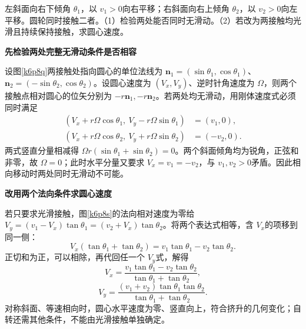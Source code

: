 \begin{question}\begin{example}[两斜面夹轮的约束检验]\label{k6p8}
左斜面向右下倾角 $\theta_1$，以 $v_1>0$向右平移；右斜面向右上倾角 $\theta_2$，以 $v_2>0$向左平移。圆轮同时接触二者。（1）检验两处能否同时无滑动。（2）若改为两接触均光滑且持续保持接触，求圆心速度。\end{example}
\end{question}
\begin{solution}\textbf{先检验两处完整无滑动条件是否相容}\par\nobreak
设图\ref{k6p8q}两接触处指向圆心的单位法线为 $\bm n_1=(\sin\theta_1,\cos\theta_1)$、$\bm n_2=(-\sin\theta_2,\cos\theta_2)$。设圆心速度为 $(V_x,V_y)$、逆时针角速度为 $\Omega$，则两个接触点相对圆心的位矢分别为 $-r\bm n_1,-r\bm n_2$。若两处均无滑动，用刚体速度式必须同时满足
\begin{align*}
 (V_x+r\Omega\cos\theta_1,\ V_y-r\Omega\sin\theta_1)&=(v_1,0),\\
 (V_x+r\Omega\cos\theta_2,\ V_y+r\Omega\sin\theta_2)&=(-v_2,0).
\end{align*}
两式竖直分量相减得 $\Omega r(\sin\theta_1+\sin\theta_2)=0$。两个斜面倾角均为锐角，正弦和非零，故 $\Omega=0$；此时水平分量又要求 $V_x=v_1=-v_2$，与 $v_1,v_2>0$矛盾。因此相向移动时两处同时无滑动不可能。



\par\medskip{}\noindent\textbf{改用两个法向条件求圆心速度}\par\nobreak
若只要求光滑接触，图\ref{k6p8s}的法向相对速度为零给 $V_y=(v_1-V_x)\tan\theta_1=(v_2+V_x)\tan\theta_2$。将两个表达式相等，含 $V_x$的项移到同一侧：
\[
 V_x(\tan\theta_1+\tan\theta_2)
 =v_1\tan\theta_1-v_2\tan\theta_2.
\]
正切和为正，可以相除，再代回任一个 $V_y$式，解得
\[\boxed{V_x=\frac{v_1\tan\theta_1-v_2\tan\theta_2}{\tan\theta_1+\tan\theta_2}},\]
\[\boxed{V_y=\frac{(v_1+v_2)\tan\theta_1\tan\theta_2}{\tan\theta_1+\tan\theta_2}}.\]
对称斜面、等速相向时，圆心水平速度为零、竖直向上，符合挤升的几何变化；自转还需其他条件，不能由光滑接触单独确定。




\end{solution}
